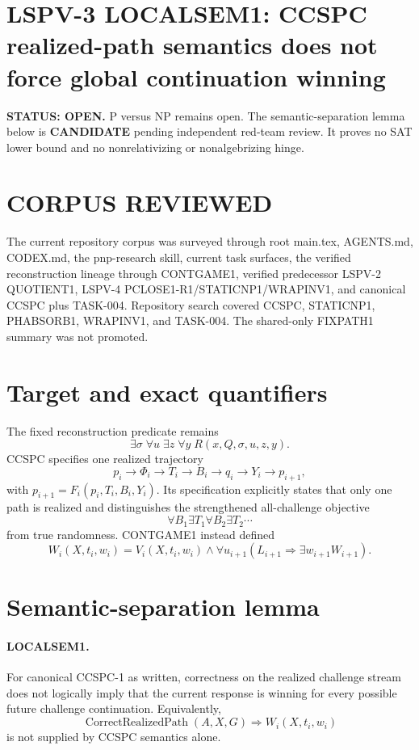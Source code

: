 \documentclass[11pt]{article}
\begin{document}
\section*{LSPV-3 LOCALSEM1: CCSPC realized-path semantics does not force global continuation winning}
\textbf{STATUS: OPEN.} P versus NP remains open. The semantic-separation lemma below is \textbf{CANDIDATE} pending independent red-team review. It proves no SAT lower bound and no nonrelativizing or nonalgebrizing hinge.

\section*{CORPUS REVIEWED}
The current repository corpus was surveyed through root main.tex, AGENTS.md, CODEX.md, the pnp-research skill, current task surfaces, the verified reconstruction lineage through CONTGAME1, verified predecessor LSPV-2 QUOTIENT1, LSPV-4 PCLOSE1-R1/STATICNP1/WRAPINV1, and canonical CCSPC plus TASK-004. Repository search covered CCSPC, STATICNP1, PHABSORB1, WRAPINV1, and TASK-004. The shared-only FIXPATH1 summary was not promoted.

\section*{Target and exact quantifiers}
The fixed reconstruction predicate remains
\[
\exists\sigma\;\forall u\;\exists z\;\forall y\;R(x,Q,\sigma,u,z,y).
\]
CCSPC specifies one realized trajectory
\[
p_i\to\Phi_i\to T_i\to B_i\to q_i\to Y_i\to p_{i+1},
\]
with \(p_{i+1}=F_i(p_i,T_i,B_i,Y_i)\). Its specification explicitly states that only one path is realized and distinguishes the strengthened all-challenge objective
\[
\forall B_1\exists T_1\forall B_2\exists T_2\cdots
\]
from true randomness. CONTGAME1 instead defined
\[
W_i(X,t_i,w_i)=V_i(X,t_i,w_i)\wedge
\forall u_{i+1}(L_{i+1}\Rightarrow\exists w_{i+1}W_{i+1}).
\]

\section*{Semantic-separation lemma}
\paragraph{LOCALSEM1.}
For canonical CCSPC-1 as written, correctness on the realized challenge stream does not logically imply that the current response is winning for every possible future challenge continuation. Equivalently,
\[
\operatorname{CorrectRealizedPath}(A,X,G)\Longrightarrow W_i(X,t_i,w_i)
\]
is not supplied by CCSPC semantics alone.
\end{document}
